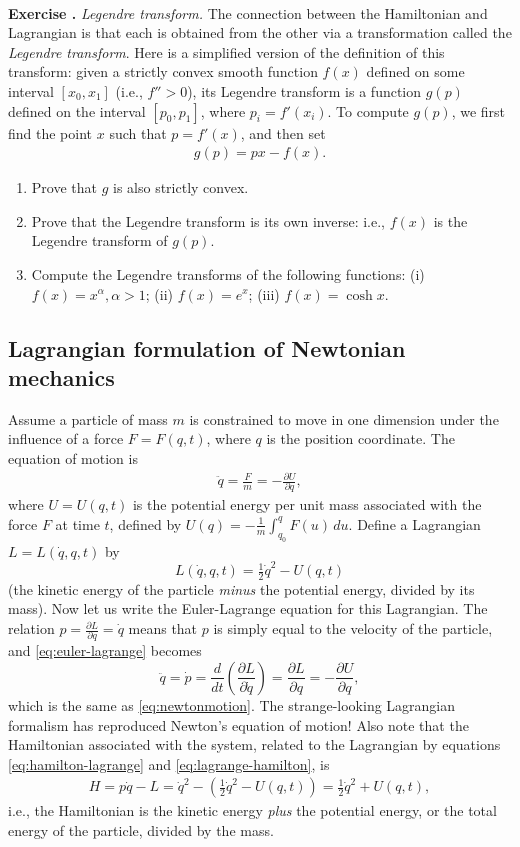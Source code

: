 \documentclass[12pt]{amsart}
\newcommand{\eq}[1]{\begin{equation}\begin{split}#1\end{split}\end{equation}}
\newcommand{\eqst}[1]{\begin{align*}#1\end{align*}}
\newcommand{\der}[2]{\frac{d#1}{d#2}}
\newcommand{\pder}[2]{\frac{\partial#1}{\partial#2}}
\newcounter{exercise}
\newcommand{\beginexercise}[1]{\ \\ \addtocounter{exercise}{1} \textbf{Exercise \arabic{exercise}.} \textit{#1.}}
\begin{document}
\beginexercise{Legendre transform} The connection between the Hamiltonian and Lagrangian is that each is obtained from the other via a transformation called the \emph{Legendre transform}. Here is a simplified version of the definition of this transform: given a strictly convex smooth function $f(x)$ defined on some interval $[x_0,x_1]$ (i.e., $f''>0$), its Legendre transform is a function $g(p)$ defined on the interval $[p_0,p_1]$, where $p_i=f'(x_i)$. To compute $g(p)$, we first find the point $x$ such that $p=f'(x)$, and then set
\eqst{
g(p) = px - f(x).
}
\begin{enumerate}
\item Prove that $g$ is also strictly convex.
\item Prove that the Legendre transform is its own inverse: i.e., $f(x)$ is the Legendre transform of $g(p)$.
\item Compute the Legendre transforms of the following functions: (i) $f(x)=x^{\alpha}, \alpha>1$; (ii) $f(x)=e^x$; (iii) $f(x)=\cosh x$.
\end{enumerate}



\subsection{Lagrangian formulation of Newtonian mechanics} Assume a particle of mass $m$ is constrained to move in one dimension under the influence of a force $F=F(q,t)$, where $q$ is the position coordinate. The equation of motion is
\eq{ \label{eq:newtonmotion}
\ddot{q} = \frac{F}{m} = -\pder{U}{q},
}
where $U=U(q,t)$ is the potential energy per unit mass associated with the force $F$ at time $t$, defined by $U(q)=-\frac{1}{m}\int_{q_0}^ q F(u)\,du$.
Define a Lagrangian $L=L(\dot{q},q,t)$ by
$$ 
L(\dot{q},q,t) = \tfrac12 \dot{q}^2 - U(q,t)
$$
(the kinetic energy of the particle \emph{minus} the potential energy, divided by its mass). Now let us write the Euler-Lagrange equation for this Lagrangian. The relation $p=\pder{L}{q} = \dot{q}$ means that $p$ is simply equal to the velocity of the particle, and \eqref{eq:euler-lagrange} becomes
$$ \ddot{q} = \dot{p} = \der{}{t} \left( \pder{L}{\dot{q}} \right) = \pder{L}{q} = -\pder{U}{q}, $$
which is the same as \eqref{eq:newtonmotion}. The strange-looking Lagrangian formalism has reproduced Newton's equation of motion! Also note that the Hamiltonian associated with the system, related to the Lagrangian by equations \eqref{eq:hamilton-lagrange} and \eqref{eq:lagrange-hamilton}, is
\eqst{
H = p \dot{q} - L = \dot{q}^2 - \left( \tfrac12 \dot{q}^2 - U(q,t) \right)
= \tfrac12 \dot{q}^2 + U(q,t), 
}
i.e., the Hamiltonian is the kinetic energy \emph{plus} the potential energy, or the total energy of the particle, divided by the mass.
\end{document}
